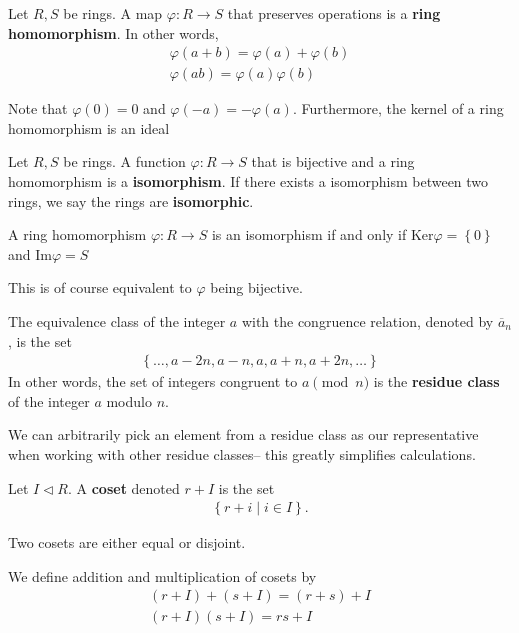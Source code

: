 \documentclass{memoir}
\begin{document}
\begin{defn}
	Let \(R,S\) be rings. A map \(\varphi:R\to S\) that preserves operations is a \textbf{ring homomorphism}. In other words,
	\begin{align*}
		\varphi(a+b) = \varphi(a)+\varphi(b) \\
		\varphi(ab) = \varphi(a)\varphi(b)
	\end{align*}
\end{defn}
Note that \(\varphi(0) = 0\) and \(\varphi(-a) = -\varphi(a)\). Furthermore, the kernel of a ring homomorphism is an ideal
\begin{defn}[Isomorphism]
	Let \(R,S\) be rings. A function \(\varphi:R\to S\) that is bijective and a ring homomorphism is a \textbf{isomorphism}. If there exists a isomorphism between two rings, we say the rings are \textbf{isomorphic}. 
\end{defn}
\begin{prop}
	A ring homomorphism \(\varphi:R\to S\) is an isomorphism if and only if \( \textrm{Ker}\varphi = \left\{ 0 \right\} \) and \( \textrm{Im}\varphi = S\)
\end{prop}
This is of course equivalent to \(\varphi\) being bijective.
\begin{defn}
The equivalence class of the integer \(a\) with the congruence relation, denoted by \(\overline{a}_n\), is the set
\begin{align*}
	\left\{ \ldots,a-2n,a-n,a,a+n,a+2n,\ldots \right\} 
\end{align*}
In other words, the set of integers congruent to \(a \pmod n\) is the \textbf{residue class} of the integer \(a\) modulo \(n\). 
\end{defn}

We can arbitrarily pick an element from a residue class as our representative when working with other residue classes-- this greatly simplifies calculations.

\begin{defn}[Coset]
	Let \(I \triangleleft R	\). A \textbf{coset} denoted \(r + I\) is the set
	\begin{align*}
	\left\{r+i \mid i \in I \right\} .
	\end{align*}
\end{defn}

\begin{prop}
	Two cosets are either equal or disjoint.
\end{prop}

We define addition and multiplication of cosets by
\begin{align*}
	(r+I) + (s+I) = (r+s) + I \\
	(r+I)(s+I) = rs + I
\end{align*}
\end{document}

